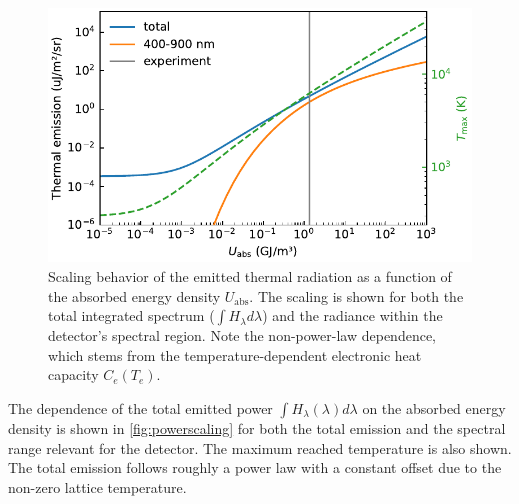 \documentclass[
	a4paper,
]{scrarticle}
\begin{document}
\begin{figure}
    \centering
    \includegraphics{../analysis/figures/powerscaling.pdf}
    \caption{Scaling behavior of the emitted thermal radiation as a function of the absorbed energy density $U_{\text{abs}}$. The scaling is shown for both the total integrated spectrum ($\int H_\lambda d\lambda$) and the radiance within the detector's spectral region. Note the non-power-law dependence, which stems from the temperature-dependent electronic heat capacity $C_e(T_e)$.}
    \label{fig:powerscaling}
\end{figure}
The dependence of the total emitted power $\int H_\lambda(\lambda) d\lambda$ on the absorbed energy density is shown in \autoref{fig:powerscaling} for both the total emission and the spectral range relevant for the detector.
The maximum reached temperature is also shown.
The total emission follows roughly a power law with a constant offset due to the non-zero lattice temperature.

\clearpage
\end{document}
